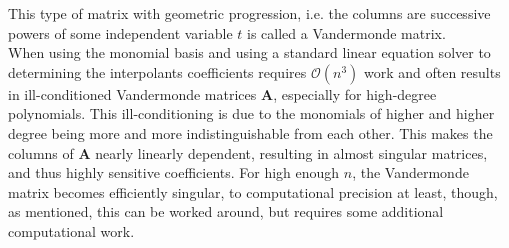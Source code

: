 \documentclass[../../CompleteThesis/Complete_1stDraft.tex]{subfiles}
\begin{document}
This type of matrix with geometric progression, i.e. the columns are successive powers of some independent variable $t$ is called a Vandermonde matrix. \\
When using the monomial basis and using a standard linear equation solver to determining the interpolants coefficients requires $\mathcal{O}(n^3)$ work and often results in ill-conditioned Vandermonde matrices $\boldsymbol{A}$, especially for high-degree polynomials. This ill-conditioning is due to the monomials of higher and higher degree being more and more indistinguishable  from each other. This makes the columns of $\boldsymbol{A}$ nearly linearly dependent, resulting in almost singular matrices, and thus highly sensitive coefficients. For high enough $n$, the Vandermonde matrix becomes efficiently singular, to computational precision at least, though, as mentioned, this can be worked around, but requires some additional computational work. 
\end{document}
